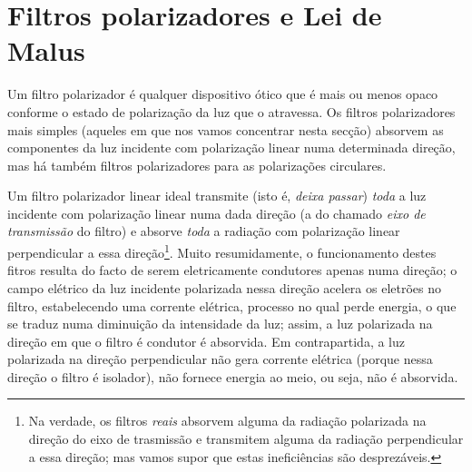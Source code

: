 \section{Filtros polarizadores e Lei de Malus}
Um filtro polarizador é qualquer dispositivo ótico que é mais ou menos opaco
conforme o estado de polarização da luz que o atravessa. Os filtros
polarizadores mais simples (aqueles em que nos vamos concentrar nesta secção)
absorvem as componentes da luz incidente com polarização linear numa determinada
direção, mas há também filtros polarizadores para as polarizações circulares.

Um filtro polarizador linear ideal transmite (isto é, \emph{deixa passar})
\emph{toda} a luz incidente com polarização linear numa dada direção (a do
chamado \emph{eixo de transmissão} do filtro) e absorve \emph{toda} a radiação
com polarização linear perpendicular a essa direção\footnote{Na verdade, os filtros
\emph{reais} absorvem alguma da radiação polarizada na direção do eixo de
trasmissão e transmitem alguma da radiação perpendicular a essa direção; mas
vamos supor que estas ineficiências são desprezáveis.}. Muito resumidamente, o
funcionamento destes fitros resulta do facto de serem eletricamente condutores
apenas numa direção; o campo elétrico da luz incidente polarizada nessa direção
acelera os eletrões no filtro, estabelecendo uma corrente elétrica, processo no
qual perde energia, o que se traduz numa diminuição da intensidade da luz;
assim, a luz polarizada na direção em que o filtro é condutor
é absorvida. Em contrapartida, a luz polarizada na direção perpendicular não
gera corrente elétrica (porque nessa direção o filtro é isolador), não fornece
energia ao meio, ou seja, não é absorvida.

